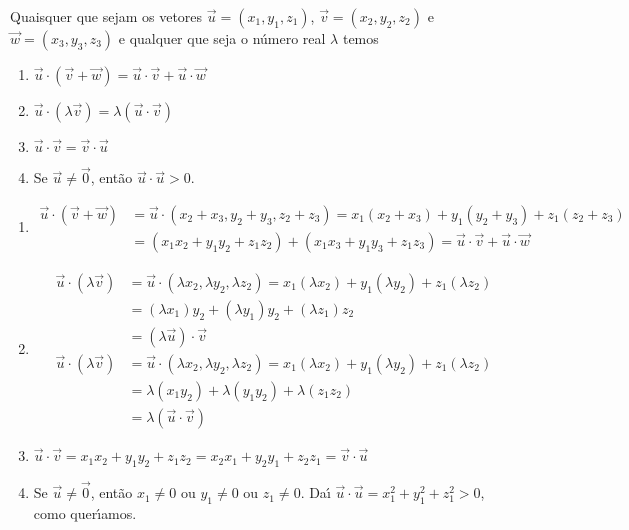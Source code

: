 \begin{proposicao}
  Quaisquer que sejam os vetores $\vec{u} = (x_1, y_1,z_1)$, $\vec{v} = (x_2, y_2,z_2)$ e $\vec{w} = (x_3, y_3,z_3)$ e qualquer que seja o n\'umero real $\lambda$ temos
  \begin{enumerate}
    \item $\vec{u}\cdot(\vec{v} + \vec{w}) = \vec{u}\cdot\vec{v} + \vec{u}\cdot\vec{w}$
    \item $\vec{u}\cdot(\lambda\vec{v}) = \lambda(\vec{u}\cdot\vec{v})$
    \item $\vec{u}\cdot\vec{v} = \vec{v}\cdot\vec{u}$
    \item Se $\vec{u} \ne \vec{0}$, ent\~ao $\vec{u}\cdot\vec{u} > 0$.
  \end{enumerate}
\end{proposicao}
\begin{prova}
  \begin{enumerate}
    \item \begin{align*}
      \vec{u}\cdot(\vec{v} + \vec{w}) &= \vec{u}\cdot(x_2 + x_3, y_2 + y_3, z_2 + z_3) = x_1(x_2 + x_3) + y_1(y_2 + y_3) + z_1(z_2+z_3) \\ &= (x_1x_2 + y_1y_2 + z_1z_2) + (x_1x_3 + y_1y_3 + z_1z_3) = \vec{u}\cdot\vec{v} + \vec{u}\cdot\vec{w}
    \end{align*}
    \item \begin{align*}
      \vec{u}\cdot(\lambda\vec{v}) &= \vec{u}\cdot(\lambda x_2, \lambda y_2, \lambda z_2) = x_1(\lambda x_2) + y_1(\lambda y_2) + z_1(\lambda z_2)\\ &= (\lambda x_1)y_2 + (\lambda y_1)y_2 + (\lambda z_1)z_2 \\ &= (\lambda\vec{u})\cdot\vec{v}\\
      \vec{u}\cdot(\lambda\vec{v}) &= \vec{u}\cdot(\lambda x_2, \lambda y_2, \lambda z_2) = x_1(\lambda x_2) + y_1(\lambda y_2) + z_1(\lambda z_2)\\ &= \lambda (x_1y_2) + \lambda (y_1y_2) + \lambda(z_1z_2) \\ &= \lambda(\vec{u}\cdot\vec{v})
    \end{align*}
    \item $\vec{u}\cdot\vec{v} = x_1x_2 + y_1y_2 + z_1z_2 = x_2x_1 + y_2y_1 + z_2z_1 = \vec{v}\cdot\vec{u}$
    \item Se $\vec{u} \ne \vec{0}$, ent\~ao $x_1 \ne 0$ ou $y_1 \ne 0$ ou $z_1 \ne 0$. Da{\'\i} $\vec{u}\cdot\vec{u} = x_1^2 + y_1^2 + z_1^2> 0$, como quer{\'\i}amos.
  \end{enumerate}
\end{prova}

